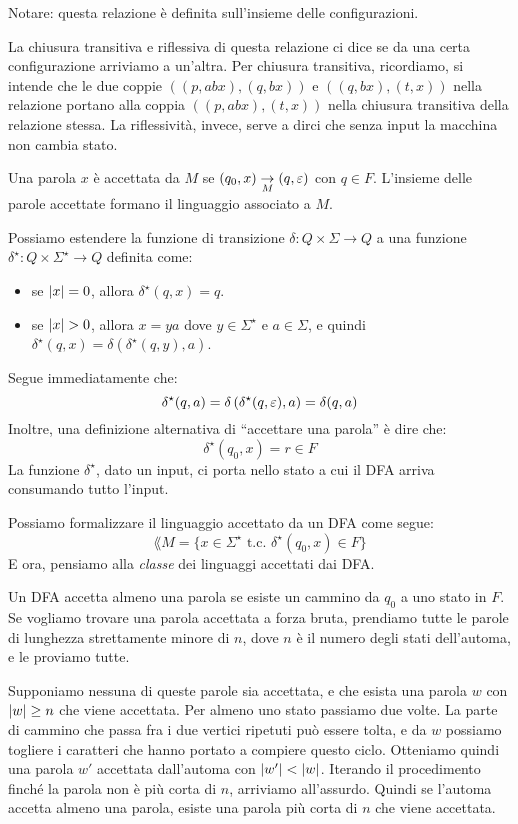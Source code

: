 Notare: questa relazione \`e definita sull'insieme delle configurazioni.

La chiusura transitiva e riflessiva di questa relazione ci dice se da una certa configurazione arriviamo a un'altra.
Per chiusura transitiva, ricordiamo, si intende che le due coppie $((p, abx), (q,bx))$ e $((q,bx),(t,x))$ nella relazione portano alla coppia $((p,abx),(t,x))$ nella chiusura transitiva della relazione stessa.
La riflessivit\`a, invece, serve a dirci che senza input la macchina non cambia stato.

Una parola $x$ \`e accettata da $M$ se $(q_0, x) \underset{M}{\to} (q,\varepsilon)$ con $q \in F$.
L'insieme delle parole accettate formano il linguaggio associato a $M$.

Possiamo estendere la funzione di transizione $\delta : Q \times \Sigma \to Q$ a una funzione $\delta^{\star}: Q \times \Sigma^{\star} \to Q$ definita come:
\begin{itemize}
	\item se $\left\lvert{x}\right\rvert = 0$, allora $\delta^{\star}(q,x) = q$.
	\item se $\left\lvert{x}\right\rvert > 0$, allora $x = ya$ dove $y \in \Sigma^{\star}$ e $a \in \Sigma$, e quindi $\delta^{\star}(q,x) = \delta \left( \delta^{\star} (q, y), a \right)$.
\end{itemize}

Segue immediatamente che:
\[
	\delta^{\star}(q,a) = \delta \left( \delta^{\star} (q, \varepsilon) , a \right) = \delta (q,a)
\]
Inoltre, una definizione alternativa di ``accettare una parola'' \`e dire che:
\[
	\delta^{\star} (q_0, x) = r \in F
\]
La funzione $\delta^{\star}$, dato un input, ci porta nello stato a cui il DFA arriva consumando tutto l'input.

Possiamo formalizzare il linguaggio accettato da un DFA come segue:
\[
	\lang{M} = \{ x \in \Sigma^{\star} \text{ t.c. } \delta^{\star} (q_0, x) \in F \}
\]
E ora, pensiamo alla \emph{classe} dei linguaggi accettati dai DFA.

Un DFA accetta almeno una parola se esiste un cammino da $q_0$ a uno stato in $F$.
Se vogliamo trovare una parola accettata a forza bruta, prendiamo tutte le parole di lunghezza strettamente minore di $n$, dove $n$ \`e il numero degli stati dell'automa, e le proviamo tutte.

Supponiamo nessuna di queste parole sia accettata, e che esista una parola $w$ con $\left\lvert{w}\right\rvert \ge n$ che viene accettata.
Per almeno uno stato passiamo due volte.
La parte di cammino che passa fra i due vertici ripetuti pu\`o essere tolta, e da $w$ possiamo togliere i caratteri che hanno portato a compiere questo ciclo.
Otteniamo quindi una parola $w'$ accettata dall'automa con $\left\lvert{w'}\right\rvert < \left\lvert{w}\right\rvert$.
Iterando il procedimento finch\'e la parola non \`e pi\`u corta di $n$, arriviamo all'assurdo.
Quindi se l'automa accetta almeno una parola, esiste una parola pi\`u corta di $n$ che viene accettata.

